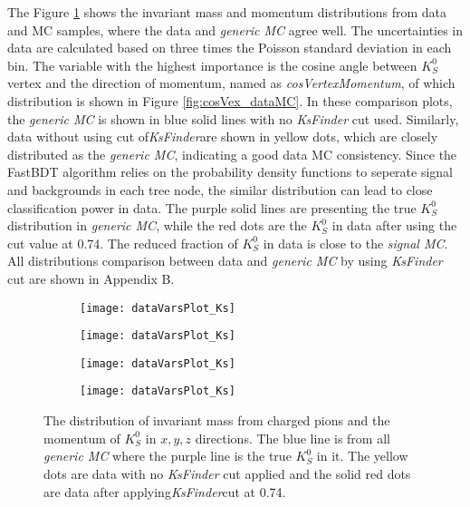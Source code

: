  The Figure \ref{fig:ksvalid_1} shows the invariant mass and momentum distributions from data and MC samples, where the data and \textit{generic MC} agree well. The uncertainties in data are calculated based on three times the Poisson standard deviation in each bin. The variable with the highest importance is the cosine angle between $K_S^0$ vertex and the direction of momentum, named as \textit{cosVertexMomentum}, of which distribution is shown in Figure \ref{fig:cosVex_dataMC}. In these comparison plots, the \textit{generic MC} is shown in blue solid lines with no \textit{KsFinder} cut used. Similarly, data without using cut of\textit{KsFinder}are shown in yellow dots, which are closely distributed as the \textit{generic MC}, indicating a good data MC consistency. Since the FastBDT algorithm relies on the probability density functions to seperate signal and backgrounds in each tree node, the similar distribution can lead to close classification power in data. The purple solid lines are presenting the true $K_S^0$ distribution in \textit{generic MC}, while the red dots are the $K_S^0$ in data after using the cut value at 0.74. The reduced fraction of $K_S^0$ in data  is close to the \textit{signal MC}. All distributions comparison between data and \textit{generic MC} by using  \textit{KsFinder} cut are shown in Appendix B.

\begin{figure}[htpb]
\begin{subfigure}{0.5\linewidth}
\texttt{[image: dataVarsPlot\_Ks]}
\end{subfigure}
\begin{subfigure}{0.5\linewidth}
\texttt{[image: dataVarsPlot\_Ks]}
\end{subfigure}
\bigskip
\begin{subfigure}{0.5\linewidth}
\texttt{[image: dataVarsPlot\_Ks]}
\end{subfigure}
\begin{subfigure}{0.5\linewidth}
\texttt{[image: dataVarsPlot\_Ks]}
\end{subfigure}
\caption{The distribution of invariant mass from charged pions and the momentum of $K_S^0$ in $x,y,z$ directions. The blue line is from all \textit{generic MC} where the purple line is the true $K_S^0$ in it. The yellow dots are data with no \textit{KsFinder} cut applied and the solid red dots are data after applying\textit{KsFinder}cut at 0.74.}
\label{fig:ksvalid_1}
\end{figure}


